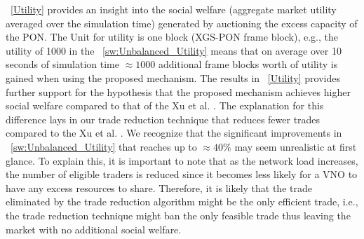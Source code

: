 \figureautorefname~\ref{Utility} provides an insight into the social welfare (aggregate market utility averaged over the simulation time) generated by auctioning the excess capacity of the PON. The Unit for utility is one block (XGS-PON frame block), e.g., the utility of 1000 in the \figureautorefname~\ref{sw:Unbalanced_Utility} means that on average over 10 seconds of simulation time $\approx1000$ additional frame blocks worth of utility is gained when using the proposed mechanism. The results in \figureautorefname~\ref{Utility} provides further support for the hypothesis that the proposed mechanism achieves higher social welfare compared to that of the Xu et al. \cite{5462277}. The explanation for this difference lays in our trade reduction technique that reduces fewer trades compared to the Xu et al. \cite{5462277}. We recognize that the significant improvements in \figureautorefname~\ref{sw:Unbalanced_Utility} that reaches up to $\approx 40\%$ may seem unrealistic at first glance. To explain this, it is important to note that as the network load increases, the number of eligible traders is reduced since it becomes less likely for a \ac{VNO} to have any excess resources to share. Therefore, it is likely that the trade eliminated by the trade reduction algorithm might be the only efficient trade, i.e., the trade reduction technique might ban the only feasible trade thus leaving the market with no additional social welfare.






